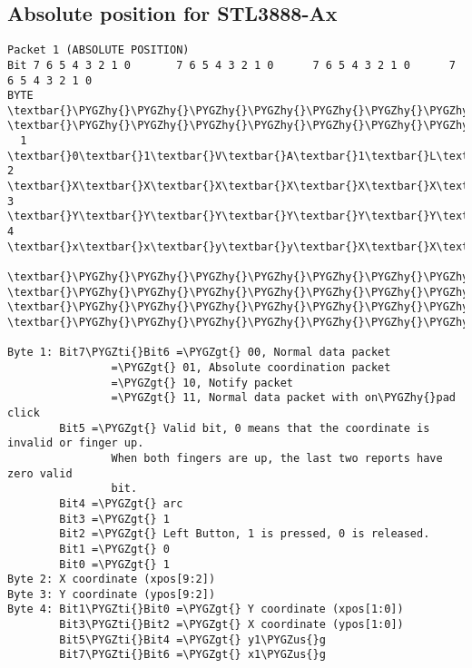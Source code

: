 \documentclass[a4paper,8pt,english]{sphinxmanual}
\def\PYGZus{\char`\_}
\def\PYGZgt{\char`\>}
\def\PYGZhy{\char`\-}
\def\PYGZti{\char`\~}
\begin{document}
\subsection{Absolute position for STL3888-Ax}
\label{input/devices/sentelic:absolute-position-for-stl3888-ax}
\begin{Verbatim}[commandchars=\\\{\}]
Packet 1 (ABSOLUTE POSITION)
Bit 7 6 5 4 3 2 1 0       7 6 5 4 3 2 1 0      7 6 5 4 3 2 1 0      7 6 5 4 3 2 1 0
BYTE  \textbar{}\PYGZhy{}\PYGZhy{}\PYGZhy{}\PYGZhy{}\PYGZhy{}\PYGZhy{}\PYGZhy{}\PYGZhy{}\PYGZhy{}\PYGZhy{}\PYGZhy{}\PYGZhy{}\PYGZhy{}\PYGZhy{}\PYGZhy{}\textbar{}BYTE \textbar{}\PYGZhy{}\PYGZhy{}\PYGZhy{}\PYGZhy{}\PYGZhy{}\PYGZhy{}\PYGZhy{}\PYGZhy{}\PYGZhy{}\PYGZhy{}\PYGZhy{}\PYGZhy{}\PYGZhy{}\PYGZhy{}\PYGZhy{}\textbar{}BYTE\textbar{}\PYGZhy{}\PYGZhy{}\PYGZhy{}\PYGZhy{}\PYGZhy{}\PYGZhy{}\PYGZhy{}\PYGZhy{}\PYGZhy{}\PYGZhy{}\PYGZhy{}\PYGZhy{}\PYGZhy{}\PYGZhy{}\PYGZhy{}\textbar{}BYTE\textbar{}\PYGZhy{}\PYGZhy{}\PYGZhy{}\PYGZhy{}\PYGZhy{}\PYGZhy{}\PYGZhy{}\PYGZhy{}\PYGZhy{}\PYGZhy{}\PYGZhy{}\PYGZhy{}\PYGZhy{}\PYGZhy{}\PYGZhy{}\textbar{}
  1   \textbar{}0\textbar{}1\textbar{}V\textbar{}A\textbar{}1\textbar{}L\textbar{}0\textbar{}1\textbar{}  2  \textbar{}X\textbar{}X\textbar{}X\textbar{}X\textbar{}X\textbar{}X\textbar{}X\textbar{}X\textbar{}  3 \textbar{}Y\textbar{}Y\textbar{}Y\textbar{}Y\textbar{}Y\textbar{}Y\textbar{}Y\textbar{}Y\textbar{}  4 \textbar{}x\textbar{}x\textbar{}y\textbar{}y\textbar{}X\textbar{}X\textbar{}Y\textbar{}Y\textbar{}
      \textbar{}\PYGZhy{}\PYGZhy{}\PYGZhy{}\PYGZhy{}\PYGZhy{}\PYGZhy{}\PYGZhy{}\PYGZhy{}\PYGZhy{}\PYGZhy{}\PYGZhy{}\PYGZhy{}\PYGZhy{}\PYGZhy{}\PYGZhy{}\textbar{}     \textbar{}\PYGZhy{}\PYGZhy{}\PYGZhy{}\PYGZhy{}\PYGZhy{}\PYGZhy{}\PYGZhy{}\PYGZhy{}\PYGZhy{}\PYGZhy{}\PYGZhy{}\PYGZhy{}\PYGZhy{}\PYGZhy{}\PYGZhy{}\textbar{}    \textbar{}\PYGZhy{}\PYGZhy{}\PYGZhy{}\PYGZhy{}\PYGZhy{}\PYGZhy{}\PYGZhy{}\PYGZhy{}\PYGZhy{}\PYGZhy{}\PYGZhy{}\PYGZhy{}\PYGZhy{}\PYGZhy{}\PYGZhy{}\textbar{}    \textbar{}\PYGZhy{}\PYGZhy{}\PYGZhy{}\PYGZhy{}\PYGZhy{}\PYGZhy{}\PYGZhy{}\PYGZhy{}\PYGZhy{}\PYGZhy{}\PYGZhy{}\PYGZhy{}\PYGZhy{}\PYGZhy{}\PYGZhy{}\textbar{}

Byte 1: Bit7\PYGZti{}Bit6 =\PYGZgt{} 00, Normal data packet
                =\PYGZgt{} 01, Absolute coordination packet
                =\PYGZgt{} 10, Notify packet
                =\PYGZgt{} 11, Normal data packet with on\PYGZhy{}pad click
        Bit5 =\PYGZgt{} Valid bit, 0 means that the coordinate is invalid or finger up.
                When both fingers are up, the last two reports have zero valid
                bit.
        Bit4 =\PYGZgt{} arc
        Bit3 =\PYGZgt{} 1
        Bit2 =\PYGZgt{} Left Button, 1 is pressed, 0 is released.
        Bit1 =\PYGZgt{} 0
        Bit0 =\PYGZgt{} 1
Byte 2: X coordinate (xpos[9:2])
Byte 3: Y coordinate (ypos[9:2])
Byte 4: Bit1\PYGZti{}Bit0 =\PYGZgt{} Y coordinate (xpos[1:0])
        Bit3\PYGZti{}Bit2 =\PYGZgt{} X coordinate (ypos[1:0])
        Bit5\PYGZti{}Bit4 =\PYGZgt{} y1\PYGZus{}g
        Bit7\PYGZti{}Bit6 =\PYGZgt{} x1\PYGZus{}g


\end{Verbatim}
\end{document}
